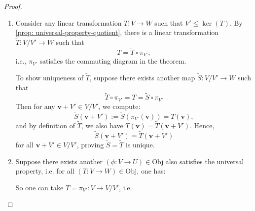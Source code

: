 \begin{proof} \begin{enumerate}
  \item Consider any linear transformation \( T : V \to W \) such that \( V' \leq \ker(T) \). By \autoref{prop: universal-property-quotient}, there is a linear transformation \( \widetilde{T} : V/V' \to W \) such that
  \[
  T = \widetilde{T} \circ \pi_{V'},
  \]
  i.e., \( \pi_{V'} \) satisfies the commuting diagram in the theorem.

  To show uniqueness of \( \widetilde{T} \), suppose there exists another map \( \widetilde{S} : V/V' \to W \) such that
  \[\widetilde{T} \circ \pi_{V'} = T = \widetilde{S} \circ \pi_{V'}\]
  Then for any \( \mathbf{v} + V' \in V/V' \), we compute:
  \[
  \widetilde{S}(\mathbf{v} + V') := \widetilde{S}(\pi_{V'}(\mathbf{v})) = T(\mathbf{v}),
  \]
  and by definition of \( \widetilde{T} \), we also have \( T(\mathbf{v}) = \widetilde{T}(\mathbf{v} + V') \). Hence,
  \[
  \widetilde{S}(\mathbf{v} + V') = \widetilde{T}(\mathbf{v} + V')
  \]
  for all \( \mathbf{v} + V' \in V/V' \), proving $\widetilde{S} = \widetilde{T}$ is unique.

  \item Suppose there exists another \((\phi : V \to U) \in \mathrm{Obj}\) also satisfies the universal property, i.e. for all $(T:V \to W) \in \mathrm{Obj}$, one has:
  
  \begin{figure}[h!]
  \centering
  \end{figure}
  
    So one can take $T = \pi_{V'}: V \to V/V'$, i.e.
  \begin{figure}[h!]
  \centering
  \end{figure}
  

\end{enumerate}
\end{proof}
